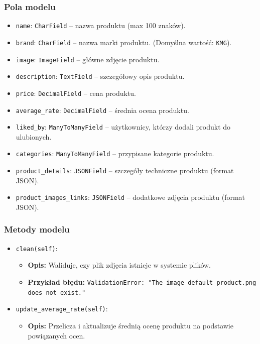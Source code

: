 \documentclass[12pt,a4paper,oneside]{article}
\theoremstyle{definition}
\numberwithin{equation}{section}
\begin{document}
\subsubsection{Pola modelu}
\begin{itemize}
    \item \texttt{name}: \texttt{CharField} – nazwa produktu (max 100 znaków).
    \item \texttt{brand}: \texttt{CharField} – nazwa marki produktu. (Domyślna wartość: \texttt{KMG}).
    \item \texttt{image}: \texttt{ImageField} – główne zdjęcie produktu.
    \item \texttt{description}: \texttt{TextField} – szczegółowy opis produktu.
    \item \texttt{price}: \texttt{DecimalField} – cena produktu.
    \item \texttt{average\_rate}: \texttt{DecimalField} – średnia ocena produktu.
    \item \texttt{liked\_by}: \texttt{ManyToManyField} – użytkownicy, którzy dodali produkt do ulubionych.
    \item \texttt{categories}: \texttt{ManyToManyField} – przypisane kategorie produktu.
    \item \texttt{product\_details}: \texttt{JSONField} – szczegóły techniczne produktu (format JSON).
    \item \texttt{product\_images\_links}: \texttt{JSONField} – dodatkowe zdjęcia produktu (format JSON).
\end{itemize}

\subsubsection{Metody modelu}
\begin{itemize}
    \item \texttt{clean(self)}:
    \begin{itemize}
        \item \textbf{Opis:} Waliduje, czy plik zdjęcia istnieje w systemie plików.
        \item \textbf{Przykład błędu:} \texttt{ValidationError: "The image default\_product.png does not exist."}
    \end{itemize}
    \item \texttt{update\_average\_rate(self)}:
    \begin{itemize}
        \item \textbf{Opis:} Przelicza i aktualizuje średnią ocenę produktu na podstawie powiązanych ocen.
    \end{itemize}
\end{itemize}
\end{document}
